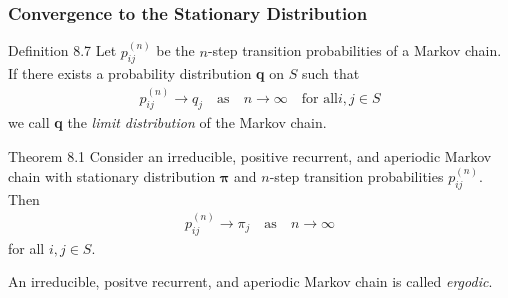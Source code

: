 \subsubsection{Convergence to the Stationary Distribution}
\begin{boks}{Definition 8.7}
  Let $p_{ij}^{(n)}$ be the $n$-step transition probabilities of a Markov chain.
  If there exists a probability distribution \textbf{q} on $S$ such that
  \begin{align*}
    p_{ij}^{(n)} \rightarrow q_j \quad \text{as} \quad n \rightarrow \infty \quad \text{for all} i,j \in S
  \end{align*}
  we call \textbf{q} the \textit{limit distribution} of the Markov chain.
\end{boks}
\begin{boks}{Theorem 8.1}
  Consider an irreducible, positive recurrent, and aperiodic Markov chain with stationary distribution $\boldsymbol{\pi}$ and $n$-step transition probabilities $p_{ij}^{(n)}$. Then
  \begin{align*}
    p_{ij}^{(n)} \rightarrow \pi_j \quad \text{as} \quad n \rightarrow \infty
  \end{align*}
  for all $i,j \in S$.
\end{boks}
An irreducible, positve recurrent, and aperiodic Markov chain is called \textit{ergodic}.
